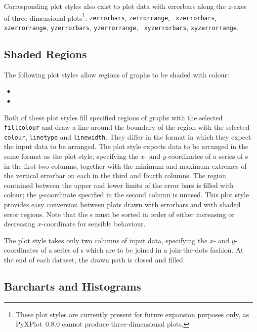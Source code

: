 Corresponding plot styles also exist to plot data with errorbars along the
$z$-axes of three-dimensional plots\footnote{These plot styles are currently
present for future expansion purposes only, as PyXPlot~0.8.0 cannot produce
three-dimensional plots.}: {\tt zerrorbars}, {\tt zerrorrange}, {\tt
xzerrorbars}, {\tt xzerrorrange}, {\tt yzerrorbars}, {\tt yzerrorrange}, {\tt
xyzerrorbars}, {\tt xyzerrorrange}.

\subsection{Shaded Regions}

The following plot styles allow regions of graphs to be shaded with colour:
\begin{itemize}
\item {}
\item {}
\end{itemize}

Both of these plot styles fill specified regions of graphs with the selected
{\tt fillcolour} and draw a line around the boundary of the region with the
selected {\tt colour}, {\tt linetype} and {\tt linewidth}. They differ in the
format in which they expect the input data to be arranged. The
 plot style expects data to be arranged in the same format
as the  plot style, specifying the $x$- and $y$-coordinates
of a series of \datapoint s in the first two columns, together with the minimum
and maximum extremes of the vertical errorbar on each \datapoint in the third
and fourth columns. The region contained between the upper and lower limits of
the error bars is filled with colour; the $y$-coordinate specified in the
second column is unused. This plot style provides easy conversion between plots
drawn with errorbars and with shaded error regions. Note that the \datapoint s
must be sorted in order of either increasing or decreasing $x$-coordinate for
sensible behaviour.

The  plot style takes only two columns of input data,
specifying the $x$- and $y$-coordinates of a series of \datapoint s which are
to be joined in a join-the-dots fashion. At the end of each dataset, the drawn
path is closed and filled.

\subsection{Barcharts and Histograms}
\label{sec:barcharts}

